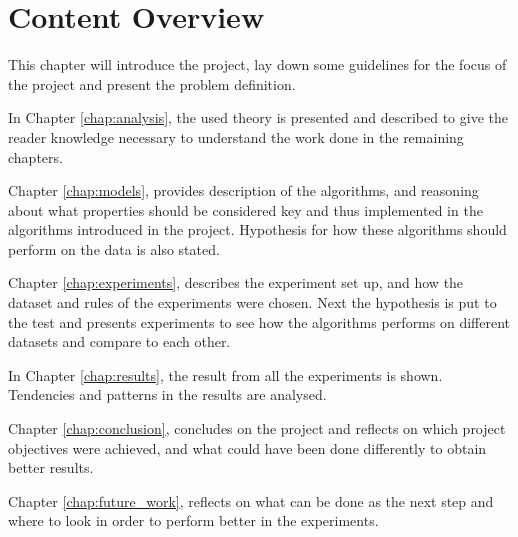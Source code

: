 \section{Content Overview}
This chapter will introduce the project, lay down some guidelines for the focus of the project and present the problem definition.

In Chapter \ref{chap:analysis}, the used theory is presented and described to give the reader knowledge necessary to understand the work done in the remaining chapters.

Chapter \ref{chap:models}, provides description of the algorithms, and reasoning about what properties should be considered key and thus implemented in the algorithms introduced in the project. Hypothesis for how these algorithms should perform on the data is also stated.

Chapter \ref{chap:experiments}, describes the experiment set up, and how the dataset and rules of the experiments were chosen. Next the hypothesis is put to the test and presents experiments to see how the algorithms performs on different datasets and compare to each other.

In Chapter \ref{chap:results}, the result from all the experiments is shown. Tendencies and patterns in the results are analysed.

Chapter \ref{chap:conclusion}, concludes on the project and reflects on which project objectives were achieved, and what could have been done differently to obtain better results.

Chapter \ref{chap:future_work}, reflects on what can be done as the next step and where to look in order to perform better in the experiments.